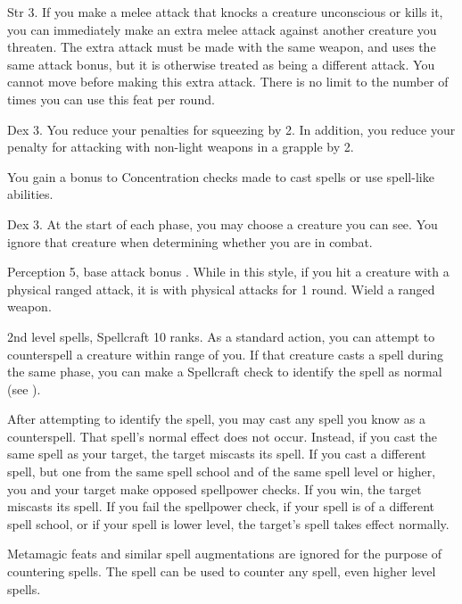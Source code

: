 \featpres
Str 3.
\featben If you make a melee attack that knocks a creature unconscious or kills it, you can immediately make an extra melee attack against another creature you threaten.
The extra attack must be made with the same weapon, and uses the same attack bonus, but it is otherwise treated as being a different attack.
You cannot move before making this extra attack.
There is no limit to the number of times you can use this feat per round.

\featpre Dex 3.
\featben You reduce your penalties for squeezing by 2. In addition, you reduce your penalty for attacking with non-light weapons in a grapple by 2.

\featben You gain a  bonus to Concentration checks made to cast spells or use spell-like abilities.

\featpre Dex 3.
\featben At the start of each phase, you may choose a creature you can see.
You ignore that creature when determining whether you are \engaged in combat.

\featpres Perception 5, base attack bonus .
\featben While in this style, if you hit a creature with a physical ranged attack, it is \impaired with physical attacks for 1 round.
\stylereq Wield a ranged weapon.

\featpres 2nd level spells, Spellcraft 10 ranks.
\featben As a standard action, you can attempt to counterspell a creature within \rngmed range of you.
If that creature casts a spell during the same phase, you can make a Spellcraft check to identify the spell as normal (see ).

After attempting to identify the spell, you may cast any spell you know as a counterspell.
That spell's normal effect does not occur.
Instead, if you cast the same spell as your target, the target miscasts its spell.
If you cast a different spell, but one from the same spell school and of the same spell level or higher, you and your target make opposed spellpower checks.
If you win, the target miscasts its spell.
If you fail the spellpower check, if your spell is of a different spell school, or if your spell is lower level, the target's spell takes effect normally.

Metamagic feats and similar spell augmentations are ignored for the purpose of countering spells.
The 
spell can be used to counter any spell, even higher level spells.

